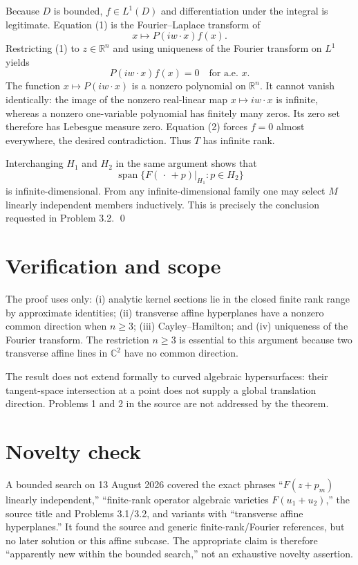 \documentclass[11pt]{article}
\newcommand{\C}{\mathbb C}
\newcommand{\R}{\mathbb R}
\begin{document}
Because $D$ is bounded, $f\in L^1(D)$ and differentiation under the
integral is legitimate.  Equation (1) is the Fourier--Laplace transform of
\[
                         x\longmapsto P(iw\cdot x)f(x).
\]
Restricting (1) to $z\in\R^n$ and using uniqueness of the Fourier transform
on $L^1$ yields
\[
                         P(iw\cdot x)f(x)=0
                         \quad\text{for a.e. }x.           \tag{2}
\]
The function $x\mapsto P(iw\cdot x)$ is a nonzero polynomial on $\R^n$.
It cannot vanish identically: the image of the nonzero real-linear map
$x\mapsto iw\cdot x$ is infinite, whereas a nonzero one-variable polynomial
has finitely many zeros.  Its zero set therefore has Lebesgue measure zero.
Equation (2) forces $f=0$ almost everywhere, the desired contradiction.
Thus $T$ has infinite rank.

Interchanging $H_1$ and $H_2$ in the same argument shows that
\[
 \operatorname{span}\{F(\,\cdot\,+p)|_{H_1}:p\in H_2\}
\]
is infinite-dimensional.  From any infinite-dimensional family one may
select $M$ linearly independent members inductively.  This is precisely the
conclusion requested in Problem 3.2.  \qed

\section*{Verification and scope}

The proof uses only: (i) analytic kernel sections lie in the closed finite
rank range by approximate identities; (ii) transverse affine hyperplanes
have a nonzero common direction when $n\ge3$; (iii) Cayley--Hamilton; and
(iv) uniqueness of the Fourier transform.  The restriction $n\ge3$ is
essential to this argument because two transverse affine lines in $\C^2$
have no common direction.

The result does not extend formally to curved algebraic hypersurfaces: their
tangent-space intersection at a point does not supply a global translation
direction.  Problems 1 and 2 in the source are not addressed by the theorem.

\section*{Novelty check}

A bounded search on 13 August 2026 covered the exact phrases
``$F(z+p_m)$ linearly independent,'' ``finite-rank operator algebraic
varieties $F(u_1+u_2)$,'' the source title and Problems 3.1/3.2, and variants
with ``transverse affine hyperplanes.''  It found the source and generic
finite-rank/Fourier references, but no later solution or this affine
subcase.  The appropriate claim is therefore ``apparently new within the
bounded search,'' not an exhaustive novelty assertion.
\end{document}
